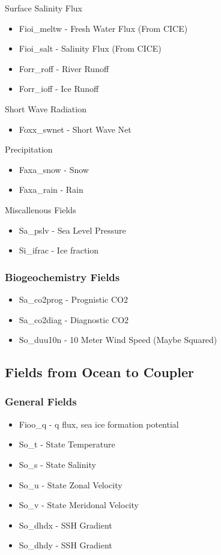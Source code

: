 \documentclass[11pt]{report}
\begin{document}
\noindent Surface Salinity Flux
\begin{itemize}
	\item Fioi\_meltw - Fresh Water Flux (From CICE)
	\item Fioi\_salt  - Salinity Flux (From CICE)
	\item Forr\_roff  - River Runoff
	\item Forr\_ioff  - Ice Runoff
\end{itemize}

\noindent Short Wave Radiation
\begin{itemize}
	\item Foxx\_swnet - Short Wave Net
\end{itemize}

\noindent Precipitation
\begin{itemize}
	\item Faxa\_snow  - Snow
	\item Faxa\_rain  - Rain
\end{itemize}

\noindent Miscallenous Fields
\begin{itemize}
	\item Sa\_pslv    - Sea Level Pressure
	\item Si\_ifrac   - Ice fraction
\end{itemize}

\subsubsection{Biogeochemistry Fields}
\begin{itemize}
	\item Sa\_co2prog - Prognistic CO2
	\item Sa\_co2diag - Diagnostic CO2
	\item So\_duu10n  - 10 Meter Wind Speed (Maybe Squared)
\end{itemize}

\subsection{Fields from Ocean to Coupler}
\subsubsection{General Fields}
\begin{itemize}
	\item Fioo\_q  - q flux, sea ice formation potential
	\item So\_t    - State Temperature
	\item So\_s    - State Salinity
	\item So\_u    - State Zonal Velocity
	\item So\_v    - State Meridonal Velocity
	\item So\_dhdx - SSH Gradient
	\item So\_dhdy - SSH Gradient
\end{itemize}
\end{document}
